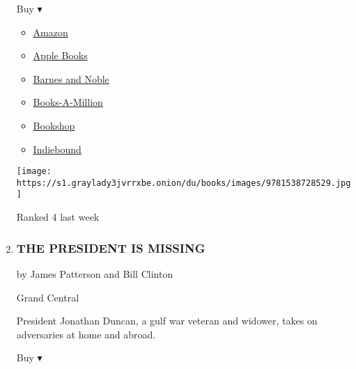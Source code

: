 \begin{enumerate}
  Buy ▾

  \begin{itemize}
  \tightlist
  \item
    \href{https://www.amazon.com/Every-Breath-Nicholas-Sparks/dp/1538728524?tag=NYTBS-20}{Amazon}
  \item
    \href{https://du-gae-books-dot-nyt-du-prd.appspot.com/buy?title=EVERY+BREATH\&author=Nicholas+Sparks}{Apple
    Books}
  \item
    \href{https://www.anrdoezrs.net/click-7990613-11819508?url=https\%3A\%2F\%2Fwww.barnesandnoble.com\%2Fw\%2F\%3Fean\%3D9781538728550}{Barnes
    and Noble}
  \item
    \href{https://www.anrdoezrs.net/click-7990613-35140?url=https\%3A\%2F\%2Fwww.booksamillion.com\%2Fp\%2FEVERY\%2BBREATH\%2FNicholas\%2BSparks\%2F9781538728550}{Books-A-Million}
  \item
    \href{https://bookshop.org/a/3546/9781538728550}{Bookshop}
  \item
    \href{https://www.indiebound.org/book/9781538728550?aff=NYT}{Indiebound}
  \end{itemize}

  \texttt{[image: https://s1.graylady3jvrrxbe.onion/du/books/images/9781538728529.jpg]}

  Ranked 4 last week
\item
  \href{https://www.nytimes3xbfgragh.onion/2018/06/05/books/review/president-is-missing-clinton-patterson.html}{}

  \hypertarget{the-president-is-missing}{%
  \subsubsection{THE PRESIDENT IS
  MISSING}\label{the-president-is-missing}}

  by James Patterson and Bill Clinton

  Grand Central

  President Jonathan Duncan, a gulf war veteran and widower, takes on
  adversaries at home and abroad.

  Buy ▾


\end{enumerate}
